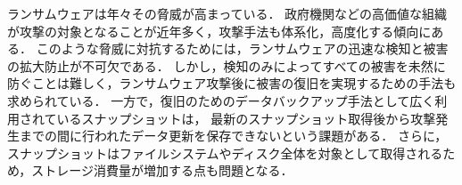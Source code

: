 

ランサムウェアは年々その脅威が高まっている．
政府機関などの高価値な組織が攻撃の対象となることが近年多く，攻撃手法も体系化，高度化する傾向にある．
このような脅威に対抗するためには，ランサムウェアの迅速な検知と被害の拡大防止が不可欠である．
しかし，検知のみによってすべての被害を未然に防ぐことは難しく，ランサムウェア攻撃後に被害の復旧を実現するための手法も求められている．
一方で，復旧のためのデータバックアップ手法として広く利用されているスナップショットは，
最新のスナップショット取得後から攻撃発生までの間に行われたデータ更新を保存できないという課題がある．
さらに，スナップショットはファイルシステムやディスク全体を対象として取得されるため，ストレージ消費量が増加する点も問題となる．

